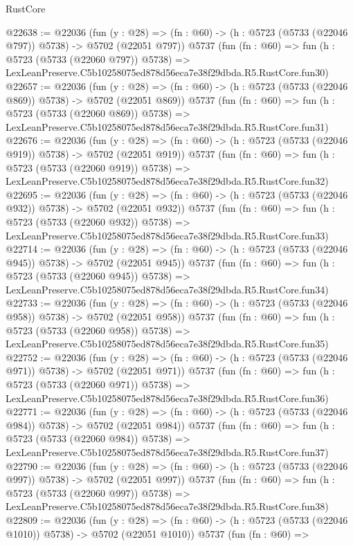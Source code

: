\begin{lexlean}{RustCore}
\begin{coremodule}
@22638 := @22036
    (fun (y : @28) => (fn : @60) -> (h : @5723 (@5733 (@22046 @797)) @5738) -> @5702 (@22051 @797))
    @5737
    (fun (fn : @60) =>
    fun (h : @5723 (@5733 (@22060 @797)) @5738) =>
    LexLeanPreserve.C5b10258075ed878d56eca7e38f29dbda.R5.RustCore.fun30)
@22657 := @22036
    (fun (y : @28) => (fn : @60) -> (h : @5723 (@5733 (@22046 @869)) @5738) -> @5702 (@22051 @869))
    @5737
    (fun (fn : @60) =>
    fun (h : @5723 (@5733 (@22060 @869)) @5738) =>
    LexLeanPreserve.C5b10258075ed878d56eca7e38f29dbda.R5.RustCore.fun31)
@22676 := @22036
    (fun (y : @28) => (fn : @60) -> (h : @5723 (@5733 (@22046 @919)) @5738) -> @5702 (@22051 @919))
    @5737
    (fun (fn : @60) =>
    fun (h : @5723 (@5733 (@22060 @919)) @5738) =>
    LexLeanPreserve.C5b10258075ed878d56eca7e38f29dbda.R5.RustCore.fun32)
@22695 := @22036
    (fun (y : @28) => (fn : @60) -> (h : @5723 (@5733 (@22046 @932)) @5738) -> @5702 (@22051 @932))
    @5737
    (fun (fn : @60) =>
    fun (h : @5723 (@5733 (@22060 @932)) @5738) =>
    LexLeanPreserve.C5b10258075ed878d56eca7e38f29dbda.R5.RustCore.fun33)
@22714 := @22036
    (fun (y : @28) => (fn : @60) -> (h : @5723 (@5733 (@22046 @945)) @5738) -> @5702 (@22051 @945))
    @5737
    (fun (fn : @60) =>
    fun (h : @5723 (@5733 (@22060 @945)) @5738) =>
    LexLeanPreserve.C5b10258075ed878d56eca7e38f29dbda.R5.RustCore.fun34)
@22733 := @22036
    (fun (y : @28) => (fn : @60) -> (h : @5723 (@5733 (@22046 @958)) @5738) -> @5702 (@22051 @958))
    @5737
    (fun (fn : @60) =>
    fun (h : @5723 (@5733 (@22060 @958)) @5738) =>
    LexLeanPreserve.C5b10258075ed878d56eca7e38f29dbda.R5.RustCore.fun35)
@22752 := @22036
    (fun (y : @28) => (fn : @60) -> (h : @5723 (@5733 (@22046 @971)) @5738) -> @5702 (@22051 @971))
    @5737
    (fun (fn : @60) =>
    fun (h : @5723 (@5733 (@22060 @971)) @5738) =>
    LexLeanPreserve.C5b10258075ed878d56eca7e38f29dbda.R5.RustCore.fun36)
@22771 := @22036
    (fun (y : @28) => (fn : @60) -> (h : @5723 (@5733 (@22046 @984)) @5738) -> @5702 (@22051 @984))
    @5737
    (fun (fn : @60) =>
    fun (h : @5723 (@5733 (@22060 @984)) @5738) =>
    LexLeanPreserve.C5b10258075ed878d56eca7e38f29dbda.R5.RustCore.fun37)
@22790 := @22036
    (fun (y : @28) => (fn : @60) -> (h : @5723 (@5733 (@22046 @997)) @5738) -> @5702 (@22051 @997))
    @5737
    (fun (fn : @60) =>
    fun (h : @5723 (@5733 (@22060 @997)) @5738) =>
    LexLeanPreserve.C5b10258075ed878d56eca7e38f29dbda.R5.RustCore.fun38)
@22809 := @22036
    (fun (y : @28) =>
    (fn : @60) -> (h : @5723 (@5733 (@22046 @1010)) @5738) -> @5702 (@22051 @1010))
    @5737
    (fun (fn : @60) =>

\end{coremodule}
\end{lexlean}
